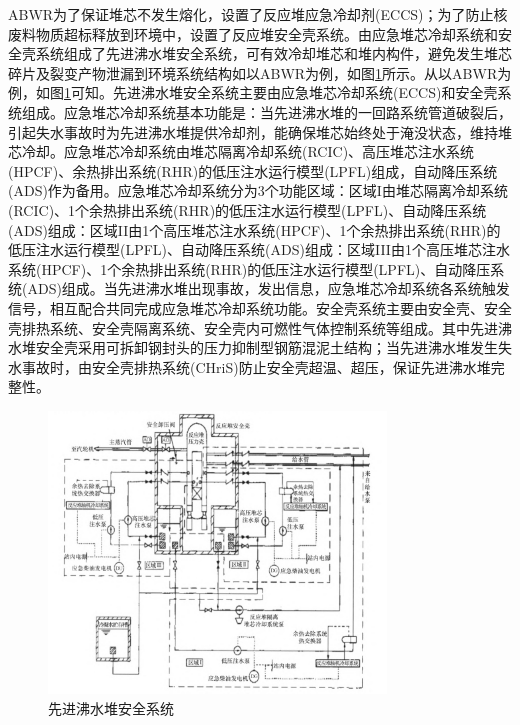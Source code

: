 \documentclass{article}
\begin{document}
ABWR为了保证堆芯不发生熔化，设置了反应堆应急冷却剂(ECCS)；为了防止核废料物质超标释放到环境中，设置了反应堆安全壳系统。由应急堆芯冷却系统和安全壳系统组成了先进沸水堆安全系统，可有效冷却堆芯和堆内构件，避免发生堆芯碎片及裂变产物泄漏到环境系统结构如以ABWR为例，如图\ref{fig:abwr-security}所示。从以ABWR为例，如图\ref{fig:abwr-security}可知。先进沸水堆安全系统主要由应急堆芯冷却系统(ECCS)和安全壳系统组成。应急堆芯冷却系统基本功能是：当先进沸水堆的一回路系统管道破裂后，引起失水事故时为先进沸水堆提供冷却剂，能确保堆芯始终处于淹没状态，维持堆芯冷却。应急堆芯冷却系统由堆芯隔离冷却系统(RCIC)、高压堆芯注水系统(HPCF)、余热排出系统(RHR)的低压注水运行模型(LPFL)组成，自动降压系统(ADS)作为备用。应急堆芯冷却系统分为3个功能区域：区域I由堆芯隔离冷却系统(RCIC)、1个余热排出系统(RHR)的低压注水运行模型(LPFL)、自动降压系统(ADS)组成：区域II由1个高压堆芯注水系统(HPCF)、1个余热排出系统(RHR)的低压注水运行模型(LPFL)、自动降压系统(ADS)组成：区域III由1个高压堆芯注水系统(HPCF)、1个余热排出系统(RHR)的低压注水运行模型(LPFL)、自动降压系统(ADS)组成。当先进沸水堆出现事故，发出信息，应急堆芯冷却系统各系统触发信号，相互配合共同完成应急堆芯冷却系统功能。安全壳系统主要由安全壳、安全壳排热系统、安全壳隔离系统、安全壳内可燃性气体控制系统等组成。其中先进沸水堆安全壳采用可拆卸钢封头的压力抑制型钢筋混泥土结构；当先进沸水堆发生失水事故时，由安全壳排热系统(CHriS)防止安全壳超温、超压，保证先进沸水堆完整性。\cite{ChenJieChaoLinJieShuiDuiYuXianJinFeiShuiDuiAnQuanTeXingChaiYiXingFenXi2016}

\begin{figure}[ht]
    \centering
    \includegraphics[width=0.8\textwidth]{figures/Security System of ABWR.png}
    \caption{先进沸水堆安全系统}
    \label{fig:abwr-security}
\end{figure}
\end{document}
